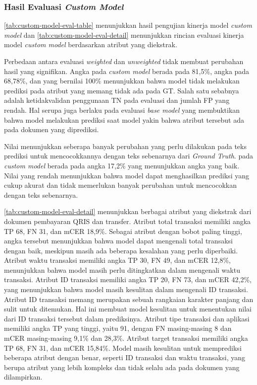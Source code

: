 \subsubsection{Hasil Evaluasi \emph{Custom Model}}
\label{subsubsec:hasil-evaluasi-custom-model}
\autoref{tab:custom-model-eval-table} menunjukkan hasil pengujian kinerja model \emph{custom model} dan \autoref{tab:custom-model-eval-detail} menunjukkan rincian evaluasi kinerja model \emph{custom model} berdasarkan atribut yang diekstrak. 

Perbedaan antara evaluasi \emph{weighted} dan \emph{unweighted} tidak membuat perubahan hasil yang signifikan. Angka \fscore{} pada \emph{custom model} berada pada 81,5\%, angka \recall{} pada 68,78\%, dan \precision{} yang bernilai 100\% menunjukkan bahwa model tidak melakukan prediksi pada atribut yang memang tidak ada pada GT. Salah satu sebabnya adalah ketidakvalidan penggunaan TN pada evaluasi dan jumlah FP yang rendah. Hal serupa juga berlaku pada evaluasi \emph{base model} yang membuktikan bahwa model \donut{} melakukan prediksi saat model yakin bahwa atribut tersebut ada pada dokumen yang diprediksi. 

Nilai \mcer{} menunjukkan seberapa banyak perubahan yang perlu dilakukan pada teks prediksi untuk mencocokkannya dengan teks sebenarnya dari \emph{Ground Truth}. \mcer{} pada \emph{custom model} berada pada angka 17,2\% yang menunjukkan angka yang baik. Nilai \mcer{} yang rendah menunjukkan bahwa model dapat menghasilkan prediksi yang cukup akurat dan tidak memerlukan banyak perubahan untuk mencocokkan dengan teks sebenarnya.

\autoref{tab:custom-model-eval-detail} menunjukkan berbagai atribut yang diekstrak dari dokumen pembayaran QRIS dan transfer. Atribut total transaksi memiliki angka TP 68, FN 31, dan mCER 18,9\%. Sebagai atribut dengan bobot paling tinggi, angka tersebut menunjukkan bahwa model dapat mengenali total transaksi dengan baik, meskipun masih ada beberapa kesalahan yang perlu diperbaiki. Atribut waktu transaksi memiliki angka TP 30, FN 49, dan mCER 12,8\%, menunjukkan bahwa model masih perlu ditingkatkan dalam mengenali waktu transaksi. Atribut ID transaksi memiliki angka TP 20, FN 73, dan mCER 42,2\%, yang menunjukkan bahwa model masih kesulitan dalam mengenali ID transaksi. Atribut ID transaksi memang merupakan sebuah rangkaian karakter panjang dan sulit untuk ditemukan. Hal ini membuat model kesulitan untuk menentukan nilai dari ID transaksi tersebut dalam prediksinya. Atribut tipe transaksi dan aplikasi memiliki angka TP yang tinggi, yaitu 91, dengan FN masing-masing 8 dan mCER masing-masing 9,1\% dan 28,3\%. Atribut target transaksi memiliki angka TP 68, FN 31, dan mCER 15,84\%. Model masih kesulitan untuk memprediksi beberapa atribut dengan benar, seperti ID transaksi dan waktu transaksi, yang berupa atribut yang lebih kompleks dan tidak selalu ada pada dokumen yang dilampirkan.
        
